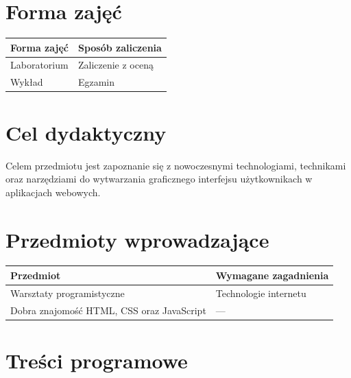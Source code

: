 \documentclass[12pt, a4paper]{article}
\begin{document}
\section{Forma zajęć}

\begin{tabular}{ll}
  \hline
  \textbf{Forma zajęć} & \textbf{Sposób zaliczenia} \\
  \hline
  Laboratorium & Zaliczenie z oceną \\
  Wykład & Egzamin \\
  \hline
\end{tabular}

\section{Cel dydaktyczny}

Celem przedmiotu jest zapoznanie się z nowoczesnymi technologiami, technikami oraz narzędziami do wytwarzania graficznego interfejsu użytkownikach w aplikacjach webowych.

\section{Przedmioty wprowadzające}

\begin{tabularx}{\textwidth}{lX}
  \hline
  \textbf{Przedmiot} & \textbf{Wymagane zagadnienia} \\
  \hline
  Warsztaty programistyczne & Technologie internetu \\
  Dobra znajomość HTML, CSS oraz JavaScript & --- \\
  \hline
\end{tabularx}

\section{Treści programowe}
\end{document}
